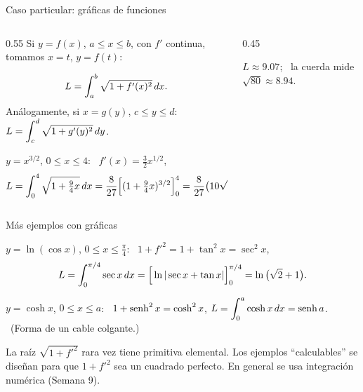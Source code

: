 \documentclass[10pt,aspectratio=169]{beamer}
\begin{document}
\begin{frame}{Caso particular: gráficas de funciones}
  \begin{columns}
    \begin{column}{0.55\textwidth}
      Si $y=f(x)$, $a\le x\le b$, con $f'$ continua, tomamos $x=t$, $y=f(t)$:
      \begin{teorema}
        \[ L=\int_a^b\sqrt{1+f'(x)^2}\,dx. \]
        Análogamente, si $x=g(y)$, $c\le y\le d$: \ $L=\displaystyle\int_c^d\sqrt{1+g'(y)^2}\,dy$.
      \end{teorema}
      \begin{ejemplo}[1]
        $y=x^{3/2}$, $0\le x\le4$: \ $f'(x)=\frac32x^{1/2}$,
        \[ L=\int_0^4\sqrt{1+\tfrac94x}\,dx=\frac{8}{27}\Big[(1+\tfrac94x)^{3/2}\Big]_0^4=\frac{8}{27}\big(10\sqrt{10}-1\big). \]
      \end{ejemplo}
    \end{column}
    \begin{column}{0.45\textwidth}
      \centering

      \small $L\approx9.07$; \ la cuerda mide $\sqrt{80}\approx8.94$.
    \end{column}
  \end{columns}
\end{frame}

\begin{frame}{Más ejemplos con gráficas}
  \begin{ejemplo}[2]
    $y=\ln(\cos x)$, $0\le x\le\frac\pi4$: \ $1+f'^2=1+\tan^2x=\sec^2x$,
    \[ L=\int_0^{\pi/4}\sec x\,dx=\Big[\ln|\sec x+\tan x|\Big]_0^{\pi/4}=\ln\big(\sqrt2+1\big). \]
  \end{ejemplo}
  \begin{ejemplo}[3: catenaria]
    $y=\cosh x$, $0\le x\le a$: \ $1+\operatorname{senh}^2x=\cosh^2x$,
    \quad $L=\displaystyle\int_0^a\cosh x\,dx=\operatorname{senh} a$. \ (Forma de un cable colgante.)
  \end{ejemplo}
  \begin{observacion}
    La raíz $\sqrt{1+f'^2}$ rara vez tiene primitiva elemental. Los ejemplos ``calculables'' se diseñan para que
    $1+f'^2$ sea un cuadrado perfecto. En general se usa integración numérica (Semana 9).
  \end{observacion}
\end{frame}
\end{document}
